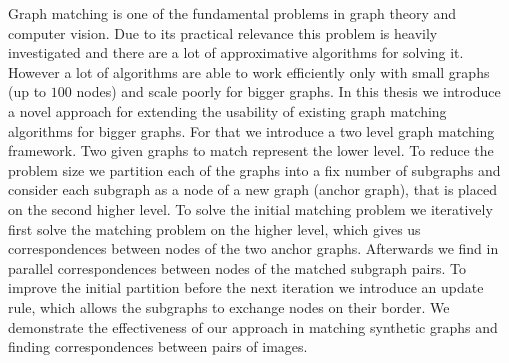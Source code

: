 Graph matching is one of the fundamental problems in graph theory and computer vision. Due to its practical relevance this problem is heavily investigated and there are a lot of approximative algorithms for solving it.
However a lot of algorithms are able to work efficiently only with small graphs (up to $100$ nodes) and scale poorly for bigger graphs. In this thesis we introduce a novel approach for extending the usability of existing graph matching algorithms for bigger graphs. For that we introduce a two level graph matching framework. Two given graphs to match represent the lower level. To reduce the problem size we partition each of the graphs into a fix number of subgraphs and consider each subgraph as a node of a new graph (anchor graph), that is placed on the second higher level. To solve the initial matching problem we iteratively first solve the matching problem on the higher level, which gives us correspondences between nodes of the two anchor graphs. Afterwards we find in parallel correspondences between nodes of the matched subgraph pairs. To improve the initial partition before the next iteration we introduce an update rule, which allows the subgraphs to exchange nodes on their border. We demonstrate the effectiveness of our approach in matching synthetic graphs and finding correspondences between pairs of images.